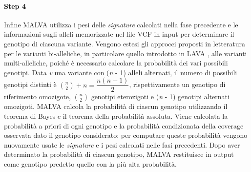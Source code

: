 \documentclass[../main.tex]{subfiles}
\begin{document}
\paragraph{Step 4} Infine MALVA utilizza i pesi delle \textit{signature} calcolati nella fase precedente e le informazioni sugli alleli memorizzate nel file VCF in input per determinare il genotipo di ciascuna variante. Vengono estesi gli approcci proposti in letteratura per le varianti bi-alleliche, in particolare quello introdotto in LAVA \cite{shajii2016lava}, alle varianti multi-alleliche, poiché è necessario calcolare la probabilità dei vari possibili genotipi. Data \textit{v} una variante con (\textit{n} - 1) alleli alternati, il numero di possibili genotipi distinti è $\binom{n}{2} + n = \dfrac{n(n+1)}{2}$, rispettivamente un genotipo di riferimento omozigote, $\binom{n}{2}$ genotipi eterozigoti e (\textit{n} - 1) genotipi alternati omozigoti. MALVA calcola la probabilità di ciascun genotipo utilizzando il teorema di Bayes e il teorema della probabilità assoluta. Viene calcolata la probabilità a priori di ogni genotipo e la probabilità condizionata della coverage osservata dato il genotipo considerato: per computare queste probabilità vengono nuovamente usate le \textit{signature} e i pesi calcolati nelle fasi precedenti. Dopo aver determinato la probabilità di ciascun genotipo, MALVA restituisce in output come genotipo predetto quello con la più alta probabilità.
\end{document}
